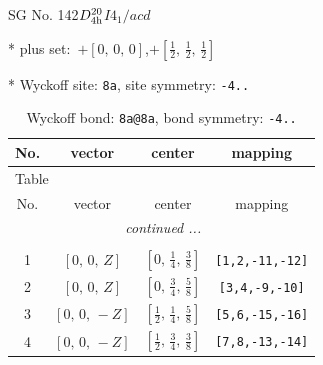 \documentclass[fleqn,8pt]{jsarticle}
\begin{document}
\setcounter{MaxMatrixCols}{32}

\renewcommand{\tablename}{Table~}
\renewcommand{\figurename}{Figure~}
\begin{center}
\LARGE
SG No. 142\quad$D_{\rm 4h}^{20}$\quad$I4_1/acd$\quad[ tetragonal ]
\end{center}

* plus set:\,\,\,$+\left[ 0,\, 0,\, 0 \right]$,\quad $+\left[ \frac{1}{2},\, \frac{1}{2},\, \frac{1}{2} \right]$


* Wyckoff site: {\tt 8a}, site symmetry: {\tt -4..}
\renewcommand{\arraystretch}{1.2}
\begin{longtable}{cccc}
\caption{Wyckoff bond: {\tt 8a@8a}, bond symmetry: {\tt -4..}}
 \\
 \hline \hline
No. & vector & center & mapping \\ \hline \endfirsthead

\multicolumn{3}{l}{\tablename\ \thetable{}} \\
 \hline \hline
No. & vector & center & mapping \\ \hline \endhead

 \hline \hline
\multicolumn{3}{r}{\footnotesize\it continued ...} \\ \endfoot

 \hline \hline
\multicolumn{3}{r}{} \\ \endlastfoot

1 & $\left[ 0,\, 0,\, Z \right]$ & $\left[ 0,\, \frac{1}{4},\, \frac{3}{8} \right]$ & {\tt [1,2,-11,-12]} \\ \hline
2 & $\left[ 0,\, 0,\, Z \right]$ & $\left[ 0,\, \frac{3}{4},\, \frac{5}{8} \right]$ & {\tt [3,4,-9,-10]} \\ \hline
3 & $\left[ 0,\, 0,\, - Z \right]$ & $\left[ \frac{1}{2},\, \frac{1}{4},\, \frac{5}{8} \right]$ & {\tt [5,6,-15,-16]} \\ \hline
4 & $\left[ 0,\, 0,\, - Z \right]$ & $\left[ \frac{1}{2},\, \frac{3}{4},\, \frac{3}{8} \right]$ & {\tt [7,8,-13,-14]} \\
\end{longtable}
\renewcommand{\arraystretch}{1.2}
\end{document}
